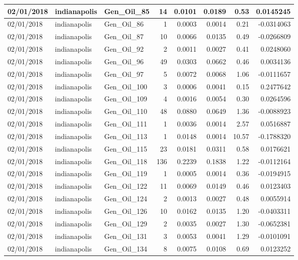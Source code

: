 \documentclass[
  letterpaper,
  DIV=11,
  numbers=noendperiod]{scrartcl}
\begin{document}
\begin{tabular}{l|l|l|r|r|r|r|r}
\hline
02/01/2018 & indianapolis & Gen\_Oil\_85 & 14 & 0.0101 & 0.0189 & 0.53 & 0.0145245\\
\hline
02/01/2018 & indianapolis & Gen\_Oil\_86 & 1 & 0.0003 & 0.0014 & 0.21 & -0.0314063\\
\hline
02/01/2018 & indianapolis & Gen\_Oil\_87 & 10 & 0.0066 & 0.0135 & 0.49 & -0.0266809\\
\hline
02/01/2018 & indianapolis & Gen\_Oil\_92 & 2 & 0.0011 & 0.0027 & 0.41 & 0.0248060\\
\hline
02/01/2018 & indianapolis & Gen\_Oil\_96 & 49 & 0.0303 & 0.0662 & 0.46 & 0.0034136\\
\hline
02/01/2018 & indianapolis & Gen\_Oil\_97 & 5 & 0.0072 & 0.0068 & 1.06 & -0.0111657\\
\hline
02/01/2018 & indianapolis & Gen\_Oil\_100 & 3 & 0.0006 & 0.0041 & 0.15 & 0.2477642\\
\hline
02/01/2018 & indianapolis & Gen\_Oil\_109 & 4 & 0.0016 & 0.0054 & 0.30 & 0.0264596\\
\hline
02/01/2018 & indianapolis & Gen\_Oil\_110 & 48 & 0.0880 & 0.0649 & 1.36 & -0.0088923\\
\hline
02/01/2018 & indianapolis & Gen\_Oil\_111 & 1 & 0.0036 & 0.0014 & 2.57 & 0.0516887\\
\hline
02/01/2018 & indianapolis & Gen\_Oil\_113 & 1 & 0.0148 & 0.0014 & 10.57 & -0.1788320\\
\hline
02/01/2018 & indianapolis & Gen\_Oil\_115 & 23 & 0.0181 & 0.0311 & 0.58 & 0.0176621\\
\hline
02/01/2018 & indianapolis & Gen\_Oil\_118 & 136 & 0.2239 & 0.1838 & 1.22 & -0.0112164\\
\hline
02/01/2018 & indianapolis & Gen\_Oil\_119 & 1 & 0.0005 & 0.0014 & 0.36 & -0.0194915\\
\hline
02/01/2018 & indianapolis & Gen\_Oil\_122 & 11 & 0.0069 & 0.0149 & 0.46 & 0.0123403\\
\hline
02/01/2018 & indianapolis & Gen\_Oil\_124 & 2 & 0.0013 & 0.0027 & 0.48 & 0.0055914\\
\hline
02/01/2018 & indianapolis & Gen\_Oil\_126 & 10 & 0.0162 & 0.0135 & 1.20 & -0.0403311\\
\hline
02/01/2018 & indianapolis & Gen\_Oil\_129 & 2 & 0.0035 & 0.0027 & 1.30 & -0.0652381\\
\hline
02/01/2018 & indianapolis & Gen\_Oil\_131 & 3 & 0.0053 & 0.0041 & 1.29 & -0.0101091\\
\hline
02/01/2018 & indianapolis & Gen\_Oil\_134 & 8 & 0.0075 & 0.0108 & 0.69 & 0.0123252\\

\end{tabular}
\end{document}
